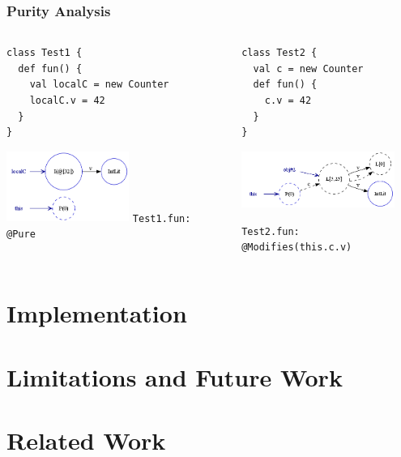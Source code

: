 \documentclass[hyperref={pdfpagelabels=false}]{beamer}
\begin{document}
\begin{frame}[fragile]
    \frametitle{Purity Analysis}
    \begin{columns}
      \begin{column}{0.4\textwidth}
\begin{lstlisting}
class Test1 {
  def fun() {
    val localC = new Counter
    localC.v = 42
  }
}
\end{lstlisting}
        \includegraphics[width=40mm]{images/purity_fun1_pt.png}
        \vspace{10pt}
        \lstinline{Test1.fun: @Pure}
      \end{column}
      \begin{column}{0.6\textwidth}
\begin{lstlisting}
class Test2 {
  val c = new Counter
  def fun() {
    c.v = 42
  }
}
\end{lstlisting}
        \includegraphics[width=50mm]{images/purity_fun2_pt.png}

        \vspace{10pt}
        \lstinline{Test2.fun: @Modifies(this.c.v)}
      \end{column}
    \end{columns}
\end{frame}

\section{Implementation}
\begin{frame}
\end{frame}

\section{Limitations and Future Work}
\begin{frame}
\end{frame}

\section{Related Work}
\begin{frame}
\end{frame}
\end{document}
